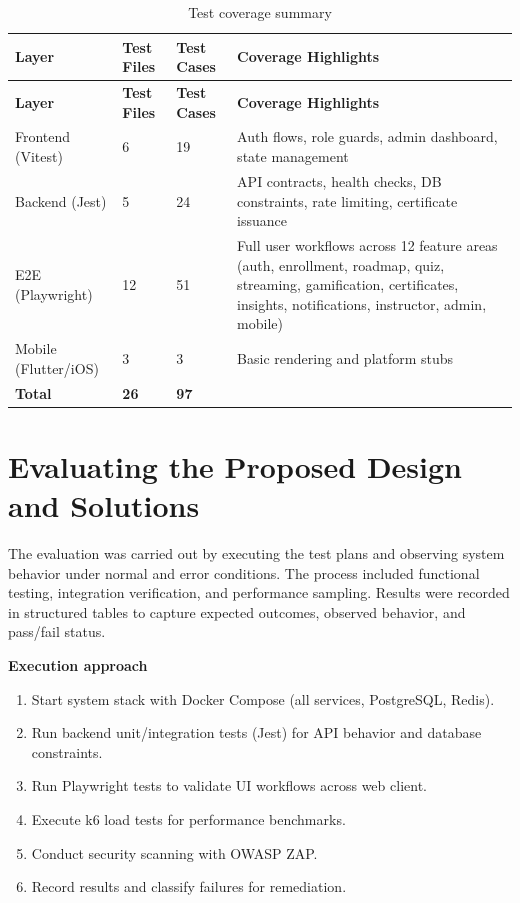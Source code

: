 \begin{longtable}{p{3cm}p{2.5cm}p{2.5cm}p{5cm}}
\caption{Test coverage summary}
\label{tab:coverage-summary}\\
\toprule
\textbf{Layer} & \textbf{Test Files} & \textbf{Test Cases} & \textbf{Coverage Highlights} \\
\midrule
\endfirsthead
\toprule
\textbf{Layer} & \textbf{Test Files} & \textbf{Test Cases} & \textbf{Coverage Highlights} \\
\midrule
\endhead
Frontend (Vitest) & 6 & 19 & Auth flows, role guards, admin dashboard, state management \\
Backend (Jest) & 5 & 24 & API contracts, health checks, DB constraints, rate limiting, certificate issuance \\
E2E (Playwright) & 12 & 51 & Full user workflows across 12 feature areas (auth, enrollment, roadmap, quiz, streaming, gamification, certificates, insights, notifications, instructor, admin, mobile) \\
Mobile (Flutter/iOS) & 3 & 3 & Basic rendering and platform stubs \\
\bottomrule
\textbf{Total} & \textbf{26} & \textbf{97} & \\
\end{longtable}

\section{Evaluating the Proposed Design and Solutions}

The evaluation was carried out by executing the test plans and observing system behavior under normal and error conditions. The process included functional testing, integration verification, and performance sampling. Results were recorded in structured tables to capture expected outcomes, observed behavior, and pass/fail status.

\textbf{Execution approach}

\begin{enumerate}
    \item Start system stack with Docker Compose (all services, PostgreSQL, Redis).
    \item Run backend unit/integration tests (Jest) for API behavior and database constraints.
    \item Run Playwright tests to validate UI workflows across web client.
    \item Execute k6 load tests for performance benchmarks.
    \item Conduct security scanning with OWASP ZAP.
    \item Record results and classify failures for remediation.
\end{enumerate}

